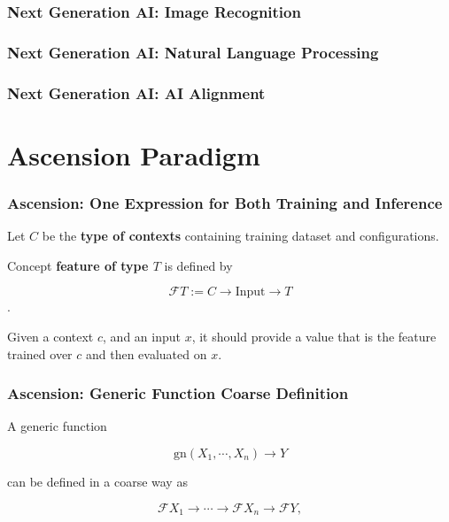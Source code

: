 \documentclass{beamer}   	%
\theoremstyle{definition}
\begin{document}
\begin{frame}
\frametitle{Next Generation AI: Image Recognition}
\end{frame}

\begin{frame}
\frametitle{Next Generation AI: Natural Language Processing}
\end{frame}

\begin{frame}
\frametitle{Next Generation AI: AI Alignment}
\end{frame}

\section{Ascension Paradigm}

\begin{frame}
\frametitle{Ascension: One Expression for Both Training and Inference}

Let $C$ be the \textbf{type of contexts} containing training dataset and configurations.

Concept \textbf{feature of type $T$} is defined by

$$\mathscr{F}T:= C\to \text{Input} \to T$$.

Given a context $c$, and an input $x$, it should provide a value that is the feature trained over $c$ and then evaluated on $x$.
\end{frame}

\begin{frame}
\frametitle{Ascension: Generic Function Coarse Definition}

A generic function

$$\text{gn}(X_1,\cdots,X_n) \to Y$$

can be defined in a coarse way as

\begin{equation} 
	 \mathscr{F}X_1\to \cdots \to\mathscr{F}X_n\to \mathscr{F}Y,
\end{equation}
\end{frame}
\end{document}
